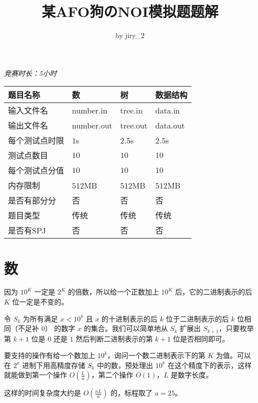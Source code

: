 \documentclass[11pt, a4paper]{article}
\title{某AFO狗のNOI模拟题题解}
\author{by jiry\_2}
\begin{document}
\maketitle

\begin{center}
\emph{竞赛时长：5小时}
\end{center}
\begin{center}
\begin{tabular}{|l|p{70pt}|p{70pt}|p{70pt}|}
	\hline
	题目名称 & 数 & 树 & 数据结构\\
	\hline
	输入文件名 & number.in & tree.in & data.in \\
	\hline
	输出文件名 & number.out & tree.out & data.out \\
	\hline
	每个测试点时限 & $1$s & $2.5$s & $2.5$s\\
	\hline
	测试点数目 & $10$ & $10$ & $10$\\
	\hline
	每个测试点分值 & $10$ & $10$ & $10$\\
	\hline
	内存限制 & $512$MB & $512$MB & $512$MB\\
	\hline
	是否有部分分 & 否 & 否 & 否\\
	\hline
	题目类型 & 传统 & 传统 & 传统\\
	\hline
	是否有SPJ & 否&否 &否 \\
     \hline
\end{tabular}
\end{center}

\begin{center}
\end{center}

\newpage
\section{数}
因为 $10^K$ 一定是 $2^K$ 的倍数，所以给一个正数加上 $10^K$ 后，它的二进制表示的后 $K$ 位一定是不变的。

令 $S_k$ 为所有满足 $x < 10^k$ 且 $x$ 的十进制表示的后 $k$ 位于二进制表示的后 $k$ 位相同（不足补 $0$） 的数字 $x$ 的集合。我们可以简单地从 $S_k$ 扩展出 $S_{k+1}$，只要枚举第 $k+1$ 位是 $0$ 还是 $1$ 然后判断二进制表示的第 $k+1$ 位是否相同即可。

要支持的操作有给一个数加上 $10^k$，询问一个数二进制表示下的第 $K$ 为值。可以在 $2^a$ 进制下用高精度存储 $S_k$ 中的数，预处理出 $10^k$ 在这个精度下的表示，这样就能做到第一个操作 $O(\frac{L}{a})$，第二个操作 $O(1)$，$L$ 是数字长度。

这样的时间复杂度大约是 $O(\frac{nL}{a})$ 的，标程取了 $a=25$。
\end{document}
